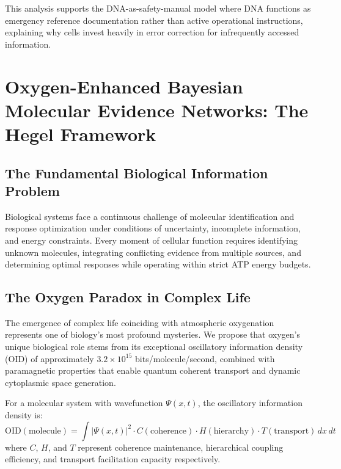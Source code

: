 ﻿\documentclass[11pt,a4paper]{article}
\begin{document}
This analysis supports the DNA-as-safety-manual model where DNA functions as emergency reference documentation rather than active operational instructions, explaining why cells invest heavily in error correction for infrequently accessed information.

\section{Oxygen-Enhanced Bayesian Molecular Evidence Networks: The Hegel Framework}

\subsection{The Fundamental Biological Information Problem}

Biological systems face a continuous challenge of molecular identification and response optimization under conditions of uncertainty, incomplete information, and energy constraints. Every moment of cellular function requires identifying unknown molecules, integrating conflicting evidence from multiple sources, and determining optimal responses while operating within strict ATP energy budgets.

\subsection{The Oxygen Paradox in Complex Life}

The emergence of complex life coinciding with atmospheric oxygenation represents one of biology's most profound mysteries. We propose that oxygen's unique biological role stems from its exceptional oscillatory information density (OID) of approximately $3.2 \times 10^{15}$ bits/molecule/second, combined with paramagnetic properties that enable quantum coherent transport and dynamic cytoplasmic space generation.

\begin{definition}
For a molecular system with wavefunction $\Psi(x,t)$, the oscillatory information density is:
\begin{equation}
\text{OID}(\text{molecule}) = \int |\Psi(x,t)|^2 \cdot C(\text{coherence}) \cdot H(\text{hierarchy}) \cdot T(\text{transport}) \, dx \, dt
\end{equation}
where $C$, $H$, and $T$ represent coherence maintenance, hierarchical coupling efficiency, and transport facilitation capacity respectively.
\end{definition}
\end{document}
